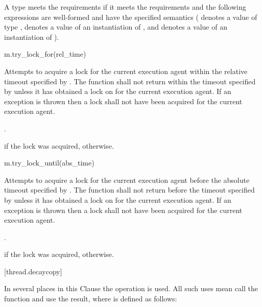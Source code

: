 \pnum
A type  meets the  requirements if it meets the 
requirements and the following expressions are well-formed and have the specified semantics
( denotes a value of type ,  denotes a value of an
instantiation of , and  denotes a value
of an instantiation of ).

\begin{itemdecl}
m.try_lock_for(rel_time)
\end{itemdecl}

\begin{itemdescr}
\pnum
\effects Attempts to acquire a lock for the current execution agent within the relative
timeout specified by . The function shall not return
within the timeout specified by  unless it has obtained a lock on 
for the current execution agent. If an exception is thrown then a lock shall not have been
acquired for the current execution agent.

\pnum
\returntype {}.

\pnum
\returns {} if the lock was acquired,  otherwise.
\end{itemdescr}

\begin{itemdecl}
m.try_lock_until(abs_time)
\end{itemdecl}

\begin{itemdescr}
\pnum
\effects Attempts to acquire a lock for the current execution agent before the absolute
timeout specified by . The function shall not return
before the timeout specified by  unless it has obtained a lock on  for
the current execution agent. If an exception is thrown then a lock shall not have been acquired
for the current execution agent.

\pnum
\returntype {}.

\pnum
\returns {} if the lock was acquired,  otherwise.
\end{itemdescr}

[thread.decaycopy]{}

\pnum
In several places in this Clause the operation
%
%
{} is used. All
such uses mean call the function  and use the
result, where  is defined as follows:

